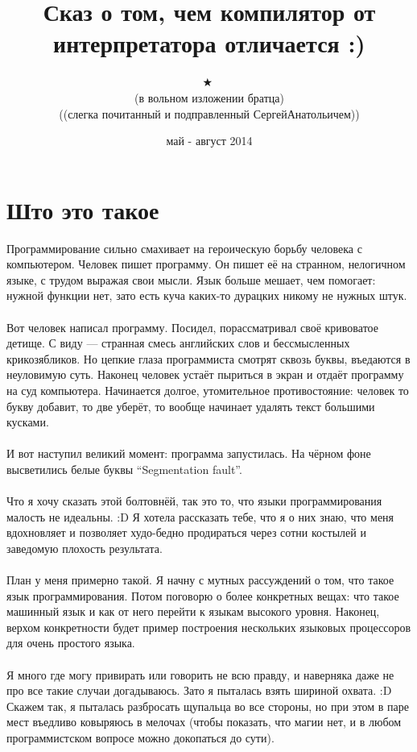 \documentclass[11pt]{book}
\title{
\small{\textleaf}
\huge{\textleaf}
\huge{\quad}
\large{Сказ о том, чем компилятор от интерпретатора отличается :)}
\huge{\quad}
\huge{\textleaf}
\small{\textleaf}
}
\author{
\small{\textborn} \ 
\small{\APLstar} \ 
\huge{\textborn} \ 
\huge{\APLstar} \ 
\Huge{$\bigstar$} \ 
\huge{\APLstar} \ 
\huge{\textborn} \ 
\small{\APLstar} \ 
\small{\textborn}
\\
\Large (в вольном изложении братца)
\\
\Large ((слегка почитанный и подправленный СергейАнатольичем))
\\
\huge{\Bicycle}
}
\date{май - август 2014}
\begin{document}
\maketitle
\pagebreak

\section*{Што это такое}
Программирование сильно смахивает на героическую борьбу человека с компьютером.
Человек пишет программу. Он пишет её на странном, нелогичном языке, с трудом выражая
свои мысли. Язык больше мешает, чем помогает: нужной функции нет, зато есть
куча каких-то дурацких никому не нужных штук.
\\ \\
Вот человек написал программу. Посидел, порассматривал своё кривоватое детище.
С виду --- странная смесь английских слов и бессмысленных крикозябликов.
Но цепкие глаза программиста смотрят сквозь буквы, въедаются
в неуловимую суть. Наконец человек устаёт пыриться в экран и отдаёт программу
на суд компьютера. Начинается долгое, утомительное противостояние: человек
то букву добавит, то две уберёт, то вообще начинает удалять текст большими кусками.
\\ \\
И вот наступил великий момент: программа запустилась. На чёрном фоне
высветились белые буквы ``Segmentation fault''.
\\ \\
Что я хочу сказать этой болтовнёй, так это то, что языки программирования малость не идеальны. :D
Я хотела рассказать тебе, что я о них знаю, что меня вдохновляет
и позволяет худо-бедно продираться через сотни костылей и заведомую плохость результата.
\\ \\
План у меня примерно такой.
Я начну с мутных рассуждений о том, что такое язык программирования.
Потом поговорю о более конкретных вещах: что такое машинный язык и как от него перейти к языкам высокого уровня.
Наконец, верхом конкретности будет пример построения нескольких языковых процессоров для очень простого языка.
\\ \\
Я много где могу привирать или говорить не всю правду, и наверняка даже не про все такие случаи догадываюсь.
Зато я пыталась взять шириной охвата. :D
Скажем так, я пыталась разбросать щупальца во все стороны, но при этом в паре мест въедливо ковыряюсь в мелочах
(чтобы показать, что магии нет, и в любом программистском вопросе можно докопаться до сути).
\end{document}
